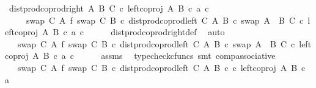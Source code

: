 \begin{isabellebody}
\ {\isachardoublequoteopen}dist{\isacharunderscore}{\kern0pt}prod{\isacharunderscore}{\kern0pt}coprod{\isacharunderscore}{\kern0pt}right\ A\ B\ C\ {\isasymcirc}\isactrlsub c\ {\isasymlangle}left{\isacharunderscore}{\kern0pt}coproj\ A\ B\ {\isasymcirc}\isactrlsub c\ a{\isacharcomma}{\kern0pt}\ c{\isasymrangle}\isanewline
\ \ \ \ {\isacharequal}{\kern0pt}\ {\isacharparenleft}{\kern0pt}{\isacharparenleft}{\kern0pt}swap\ C\ A\ {\isasymbowtie}\isactrlsub f\ swap\ C\ B{\isacharparenright}{\kern0pt}\ {\isasymcirc}\isactrlsub c\ dist{\isacharunderscore}{\kern0pt}prod{\isacharunderscore}{\kern0pt}coprod{\isacharunderscore}{\kern0pt}left\ C\ A\ B\ {\isasymcirc}\isactrlsub c\ swap\ {\isacharparenleft}{\kern0pt}A\ {\isasymCoprod}\ B{\isacharparenright}{\kern0pt}\ C{\isacharparenright}{\kern0pt}\ {\isasymcirc}\isactrlsub c\ {\isasymlangle}left{\isacharunderscore}{\kern0pt}coproj\ A\ B\ {\isasymcirc}\isactrlsub c\ a{\isacharcomma}{\kern0pt}\ c{\isasymrangle}{\isachardoublequoteclose}\isanewline
\ \ \ \ \isamarkupfalse%
\ dist{\isacharunderscore}{\kern0pt}prod{\isacharunderscore}{\kern0pt}coprod{\isacharunderscore}{\kern0pt}right{\isacharunderscore}{\kern0pt}def\ \isamarkupfalse%
\ auto\isanewline
\ \ \isamarkupfalse%
\ \isamarkupfalse%
\ {\isachardoublequoteopen}{\isachardot}{\kern0pt}{\isachardot}{\kern0pt}{\isachardot}{\kern0pt}\ {\isacharequal}{\kern0pt}\ {\isacharparenleft}{\kern0pt}swap\ C\ A\ {\isasymbowtie}\isactrlsub f\ swap\ C\ B{\isacharparenright}{\kern0pt}\ {\isasymcirc}\isactrlsub c\ dist{\isacharunderscore}{\kern0pt}prod{\isacharunderscore}{\kern0pt}coprod{\isacharunderscore}{\kern0pt}left\ C\ A\ B\ {\isasymcirc}\isactrlsub c\ swap\ {\isacharparenleft}{\kern0pt}A\ {\isasymCoprod}\ B{\isacharparenright}{\kern0pt}\ C\ {\isasymcirc}\isactrlsub c\ {\isasymlangle}left{\isacharunderscore}{\kern0pt}coproj\ A\ B\ {\isasymcirc}\isactrlsub c\ a{\isacharcomma}{\kern0pt}\ c{\isasymrangle}{\isachardoublequoteclose}\isanewline
\ \ \ \ \isamarkupfalse%
\ assms\ \isamarkupfalse%
\ {\isacharparenleft}{\kern0pt}typecheck{\isacharunderscore}{\kern0pt}cfuncs{\isacharcomma}{\kern0pt}\ smt\ comp{\isacharunderscore}{\kern0pt}associative{}{\isacharparenright}{\kern0pt}\isanewline
\ \ \isamarkupfalse%
\ \isamarkupfalse%
\ {\isachardoublequoteopen}{\isachardot}{\kern0pt}{\isachardot}{\kern0pt}{\isachardot}{\kern0pt}\ {\isacharequal}{\kern0pt}\ {\isacharparenleft}{\kern0pt}swap\ C\ A\ {\isasymbowtie}\isactrlsub f\ swap\ C\ B{\isacharparenright}{\kern0pt}\ {\isasymcirc}\isactrlsub c\ dist{\isacharunderscore}{\kern0pt}prod{\isacharunderscore}{\kern0pt}coprod{\isacharunderscore}{\kern0pt}left\ C\ A\ B\ {\isasymcirc}\isactrlsub c\ {\isasymlangle}c{\isacharcomma}{\kern0pt}\ left{\isacharunderscore}{\kern0pt}coproj\ A\ B\ {\isasymcirc}\isactrlsub c\ a{\isasymrangle}{\isachardoublequoteclose}\isanewline

\end{isabellebody}
